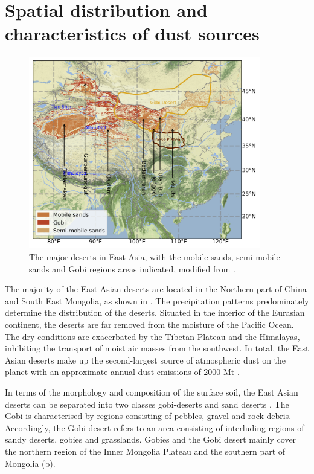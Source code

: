 \section{Spatial distribution and characteristics of dust sources}\label{sec:spatial_temporal_dust}
\begin{figure}
    \centering
    \includegraphics[width=0.9\textwidth]{texfiles/figs/map_sources_china.png}
    \caption{The major deserts in East Asia, with the mobile sands, semi-mobile sands and Gobi regions areas indicated, modified from \textcite{mao2013numerical}. }
    \label{fig:maps_deserts}
\end{figure}
The majority of the East Asian deserts are located in the Northern part of China and South East Mongolia, as shown in . The precipitation patterns predominately determine the distribution of the deserts.
Situated in the interior of the Eurasian continent, the deserts are far removed from the moisture of the Pacific Ocean. 
The dry conditions are exacerbated by the Tibetan Plateau and the Himalayas, inhibiting the transport of moist air masses from the southwest.  
In total, the East Asian deserts make up the second-largest source of atmospheric dust on the planet with an approximate annual dust emissions of 2000 Mt \parencite{chen2017overview}. 

In terms of the morphology and composition of the surface soil, the East Asian deserts can be separated into two classes gobi-deserts and sand deserts \parencite{xuan2002characterization}. The Gobi is characterised by regions consisting of pebbles, gravel and rock debris. Accordingly, the Gobi desert refers to an area consisting of interluding regions of sandy deserts, gobies and grasslands.
Gobies and the Gobi desert mainly cover the northern region of the Inner Mongolia Plateau and the southern part of Mongolia (b). 

